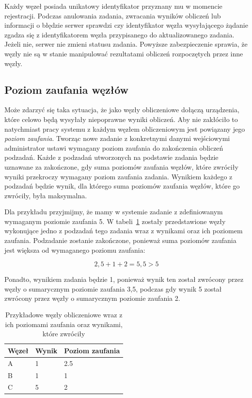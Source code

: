 \documentclass[a4paper,11pt,twoside]{report}
\theoremstyle{definition}
\begin{document}
Każdy węzeł posiada unikatowy identyfikator przyznany mu w momencie rejestracji.
Podczas anulowania zadania, zwracania wyników obliczeń lub informacji o błędzie serwer sprawdzi czy identyfikator węzła wysyłającego żądanie zgadza się z identyfikatorem węzła przypisanego do aktualizowanego zadania.
Jeżeli nie, serwer nie zmieni statusu zadania.
Powyższe zabezpieczenie sprawia, że węzły nie są w stanie manipulować rezultatami obliczeń rozpoczętych przez inne węzły.

\subsection{Poziom zaufania węzłów}
\label{poziom-zaufania-wezlow}

Może zdarzyć się taka sytuacja, że jako węzły obliczeniowe dołączą urządzenia, które celowo będą wysyłały niepoprawne wyniki obliczeń. 
Aby nie zakłóciło to natychmiast pracy systemu z każdym węzłem obliczeniowym jest powiązany jego \textit{poziom zaufania}. Tworząc nowe zadanie z konkretnymi danymi wejściowymi administrator ustawi wymagany poziom zaufania do zakończenia obliczeń podzadań.
Każde z podzadań utworzonych na podstawie zadania będzie uznawane za zakończone, gdy suma poziomów zaufania węzłów, które zwróciły wyniki przekroczy wymagany poziom zaufania zadania.
Wynikiem każdego z podzadań będzie wynik, dla którego suma poziomów zaufania węzłów, które go zwróciły, była maksymalna.

Dla przykładu przyjmijmy, że mamy w systemie zadanie z zdefiniowanym wymaganym poziomie zaufania 5. W tabeli~\ref{trust-level-example} zostały przedstawione węzły wykonujące jedno z podzadań tego zadania wraz z wynikami oraz ich poziomem zaufania.
Podzadanie zostanie zakończone, ponieważ suma poziomów zaufania jest większa od wymaganego poziomu zaufania:

\[2,5 + 1 + 2 = 5,5 > 5\]

Ponadto, wynikiem zadania będzie 1, ponieważ wynik ten został zwrócony przez węzły o sumarycznym poziomie zaufania 3,5, podczas gdy wynik 5 został zwrócony przez węzły o sumarycznym poziomie zaufania 2.

\begin{table}
    \centering
    \caption{Przykładowe węzły obliczeniowe wraz z ich poziomami zaufania oraz wynikami, które zwróciły}
    \label{trust-level-example}
    \begin{tabular}{|l|l|l|}
        \hline
        Węzeł & Wynik & Poziom zaufania \\ \hline
        A     & 1     & 2.5             \\ \hline
        B     & 1     & 1               \\ \hline
        C     & 5     & 2               \\ \hline
    \end{tabular}
\end{table}
\end{document}

